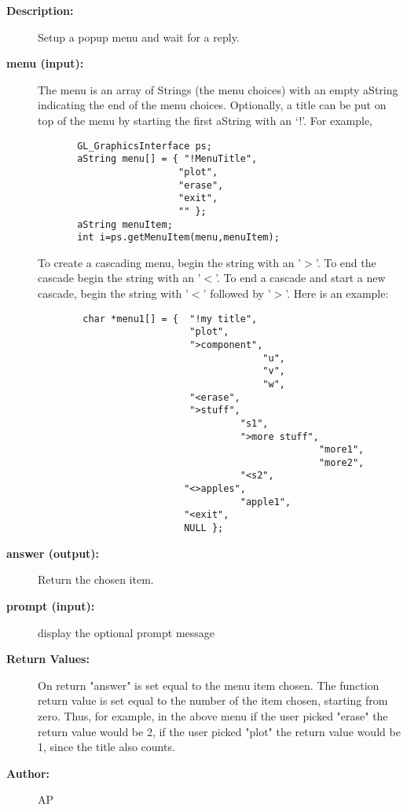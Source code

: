 \begin{description}
\item[{\bf Description:}] 
  Setup a popup menu and wait for a reply.
\item[{\bf menu (input):}] 
    The {\ff menu} is
    an array of Strings (the menu choices) with an empty aString
    indicating the end of the menu choices. Optionally, a title can be put on top of the menu by 
    starting the first aString with an `!'. For example,
    \begin{verbatim}
       GL_GraphicsInterface ps;
       aString menu[] = { "!MenuTitle",
                         "plot",
                         "erase",
                         "exit",
                         "" };
       aString menuItem;
       int i=ps.getMenuItem(menu,menuItem);
    \end{verbatim}

  To create a cascading menu, begin the string with an '$>$'.
  To end the cascade begin the string with an '$<$'.
  To end a cascade and start a new cascade, begin the string with '$<$' followed by '$>$'.
  Here is an example:
    \begin{verbatim}
        char *menu1[] = {  "!my title",
                           "plot",
                           ">component",
                                        "u",
                                        "v",
                                        "w",
                           "<erase",
                           ">stuff",
                                    "s1",
                                    ">more stuff", 
                                                  "more1",
                                                  "more2", 
                                    "<s2", 
                          "<>apples", 
                                    "apple1", 
                          "<exit",
                          NULL };  
    \end{verbatim}

\item[{\bf answer (output):}]  Return the chosen item.

\item[{\bf prompt (input):}]  display the optional prompt message
\item[{\bf Return Values:}]  On return "answer" is set equal to the 
    menu item chosen. The function return value is set equal to
    the number of the item chosen, starting from zero.
    Thus, for example, in the above menu if the user picked "erase"
    the return value would be 2, if the user picked "plot" the
    return value would be 1, since the title also counts.
\item[{\bf Author:}]  AP

\end{description}
